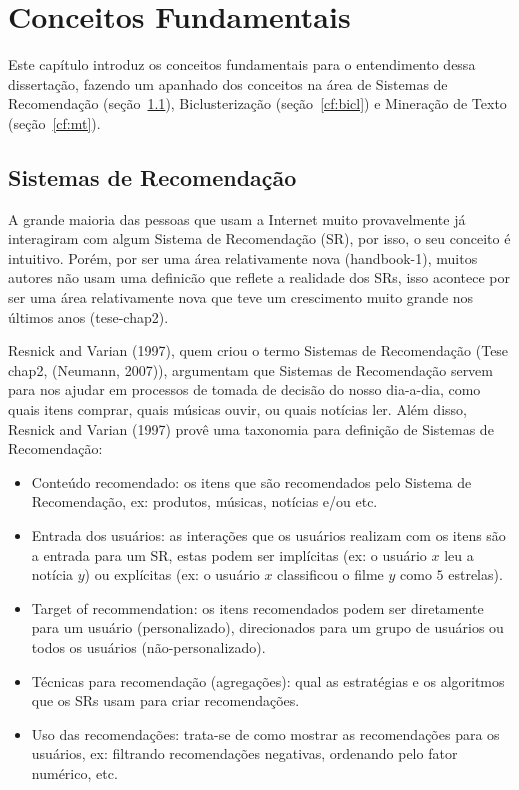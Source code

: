 \documentclass[normaltoc, espacoumemeio, pnumromarab,ruledheader]{abnt}
\begin{document}
\chapter{Conceitos Fundamentais}

Este capítulo introduz os conceitos fundamentais para o entendimento dessa dissertação, fazendo um apanhado dos conceitos na área de Sistemas de Recomendação (seção~\ref{cf:sr}), Biclusterização (seção~\ref{cf:bicl}) e Mineração de Texto (seção~\ref{cf:mt}).

\section{Sistemas de Recomendação}
\label{cf:sr}

A grande maioria das pessoas que usam a Internet muito provavelmente já interagiram com algum Sistema de Recomendação (SR), por isso, o seu conceito é intuitivo.
Porém, por ser uma área relativamente nova (handbook-1), muitos autores não usam uma definicão que reflete a realidade dos SRs, isso acontece por ser uma área relativamente nova que teve um crescimento muito grande nos últimos anos (tese-chap2).

Resnick and Varian (1997), quem criou o termo Sistemas de Recomendação (Tese chap2, (Neumann, 2007)), argumentam que Sistemas de Recomendação servem para nos ajudar em processos de tomada de decisão do nosso dia-a-dia, como quais itens comprar, quais músicas ouvir, ou quais notícias ler.
Além disso, Resnick and Varian (1997) provê uma taxonomia para definição de Sistemas de Recomendação:
\begin{itemize}
  \item Conteúdo recomendado: os itens que são recomendados pelo Sistema de Recomendação, ex: produtos, músicas, notícias e/ou etc.
  \item Entrada dos usuários: as interações que os usuários realizam com os itens são a entrada para um SR, estas podem ser implícitas (ex: o usuário $x$ leu a notícia $y$) ou explícitas (ex: o usuário $x$ classificou o filme $y$ como $5$ estrelas).
  \item Target of recommendation: os itens recomendados podem ser diretamente para um usuário (personalizado), direcionados para um grupo de usuários ou todos os usuários (não-personalizado).
  \item Técnicas para recomendação (agregações): qual as estratégias e os algoritmos que os SRs usam para criar recomendações.
  \item Uso das recomendações: trata-se de como mostrar as recomendações para os usuários, ex: filtrando recomendações negativas, ordenando pelo fator numérico, etc.
\end{itemize}
\end{document}
